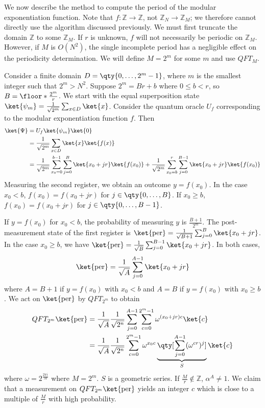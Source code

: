 We now describe the method to compute the period of the modular exponentiation function.
Note that $f \colon \mathbb Z \to \mathbb Z$, not $\mathbb Z_N \to \mathbb Z_M$; we therefore cannot directly use the algorithm discussed previously.
We must first truncate the domain $\mathbb Z$ to some $\mathbb Z_M$.
If $r$ is unknown, $f$ will not necessarily be periodic on $\mathbb Z_M$.
However, if $M$ is $O(N^2)$, the single incomplete period has a negligible effect on the periodicity determination.
We will define $M = 2^m$ for some $m$ and use $QFT_M$.

Consider a finite domain $D = \qty{0, \dots, 2^m - 1}$, where $m$ is the smallest integer such that $2^m > N^2$.
Suppose $2^m = Br + b$ where $0 \leq b < r$, so $B = \floor*{\frac{2^m}{r}}$.
We start with the equal superposition state $\ket{\psi_m} = \frac{1}{\sqrt{2^m}} \sum_{x \in D} \ket{x}$.
Consider the quantum oracle $U_f$ corresponding to the modular exponentiation function $f$.
Then
\begin{align*}
    \ket{\Psi} &= U_f \ket{\psi_m} \ket{0} \\
    &= \frac{1}{\sqrt{2^m}} \sum_{x \in D} \ket{x} \ket{f(x)} \\
    &= \frac{1}{\sqrt{2^m}} \sum_{x_0 = 0}^{b-1} \sum_{j=0}^B \ket{x_0 + jr} \ket{f(x_0)} + \frac{1}{\sqrt{2^m}} \sum_{x_0 = b}^r \sum_{j=0}^{B-1} \ket{x_0 + jr}\ket{f(x_0)}
\end{align*}
Measuring the second register, we obtain an outcome $y = f(x_0)$.
In the case $x_0 < b$, $f(x_0) = f(x_0 + jr)$ for $j \in \qty{0, \dots, B}$.
If $x_0 \geq b$, $f(x_0) = f(x_0 + jr)$ for $j \in \qty{0, \dots, B - 1}$.

If $y = f(x_0)$ for $x_0 < b$, the probability of measuring $y$ is $\frac{B+1}{2^m}$.
The post-measurement state of the first register is $\ket{\mathrm{per}} = \frac{1}{\sqrt{B+1}} \sum_{j=0}^B \ket{x_0 + jr}$.
In the case $x_0 \geq b$, we have $\ket{\mathrm{per}} = \frac{1}{\sqrt{B}} \sum_{j=0}^{B-1} \ket{x_0 + jr}$.
In both cases,
\[ \ket{\mathrm{per}} = \frac{1}{\sqrt{A}} \sum_{j=0}^{A-1} \ket{x_0 + jr} \]
where $A = B+1$ if $y = f(x_0)$ with $x_0 < b$ and $A = B$ if $y = f(x_0)$ with $x_0 \geq b$.
We act on $\ket{\mathrm{per}}$ by $QFT_{2^m}$ to obtain
\begin{align*}
    QFT_{2^m} \ket{\mathrm{per}} &= \frac{1}{\sqrt{A}} \frac{1}{\sqrt{2^n}} \sum_{j = 0}^{A-1} \sum_{c=0}^{2^m - 1} \omega^{(x_0 + jr)c}\ket{c} \\
    &=  \frac{1}{\sqrt{A}} \frac{1}{\sqrt{2^n}} \sum_{c=0}^{2^m - 1} \omega^{x_0 c} \underbrace{\qty[\sum_{j = 0}^{A-1} (\omega^{cr})^j]}_{S} \ket{c} \\
\end{align*}
where $\omega = 2^{\frac{2\pi i}{M}}$ where $M = 2^m$.
$S$ is a geometric series.
If $\frac{M}{r} \not\in \mathbb Z$, $\alpha^A \neq 1$.
We claim that a measurement on $QFT_{2^m} \ket{\mathrm{per}}$ yields an integer $c$ which is close to a multiple of $\frac{M}{r}$ with high probability.

